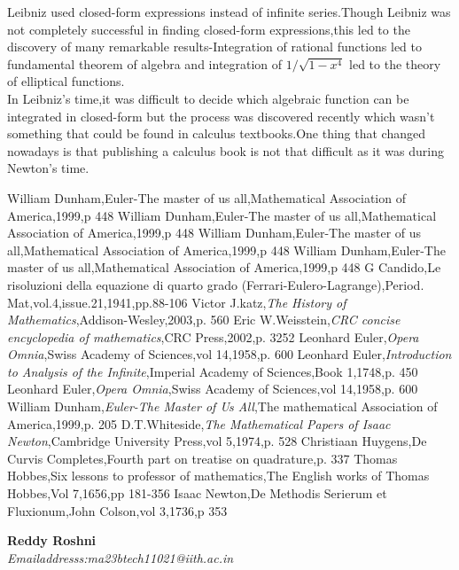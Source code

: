 \documentclass[a4paper,reqno,11pt]{book}
\theoremstyle{plain}%
\theoremstyle{definition}
\begin{document}
\indent Leibniz used closed-form expressions instead of infinite series.Though Leibniz was not completely successful in finding closed-form expressions,this led to the discovery of many remarkable results-Integration of rational functions led to fundamental theorem of algebra and integration of $1/\sqrt{1-x^4}$ led to the theory of elliptical functions.\\
\indent In Leibniz's time,it was difficult to decide which algebraic function can be integrated in closed-form but the process was discovered recently which wasn't something that could be found in calculus textbooks.One thing that changed nowadays is that publishing a calculus book is not that difficult as it was during Newton's time.


\begin{thebibliography}{99}
William Dunham,Euler-The master of us all,Mathematical Association of America,1999,p 448
William Dunham,Euler-The master of us all,Mathematical Association of America,1999,p 448
William Dunham,Euler-The master of us all,Mathematical Association of America,1999,p 448
William Dunham,Euler-The master of us all,Mathematical Association of America,1999,p 448
 G Candido,Le risoluzioni della equazione di quarto grado (Ferrari-Eulero-Lagrange),Period. Mat,vol.4,issue.21,1941,pp.88-106
	Victor J.katz,\textit{The History of Mathematics},Addison-Wesley,2003,p. 560
 Eric W.Weisstein,\textit{CRC concise encyclopedia of mathematics},CRC Press,2002,p. 3252 
 Leonhard Euler,\textit{Opera Omnia},Swiss Academy of Sciences,vol 14,1958,p. 600
 Leonhard Euler,\textit{Introduction to Analysis of the Infinite},Imperial Academy of Sciences,Book 1,1748,p. 450
 Leonhard Euler,\textit{Opera Omnia},Swiss Academy of Sciences,vol 14,1958,p. 600
 William Dunham,\textit{Euler-The Master of Us All},The mathematical Association of America,1999,p. 205
 D.T.Whiteside,\textit{The Mathematical Papers of Isaac Newton},Cambridge University Press,vol 5,1974,p. 528
 Christiaan Huygens,De Curvis Completes,Fourth part on treatise on quadrature,p. 337
 Thomas Hobbes,Six lessons to professor of mathematics,The English works of Thomas Hobbes,Vol 7,1656,pp 181-356
 Isaac Newton,De Methodis Serierum et Fluxionum,John Colson,vol 3,1736,p 353
\end{thebibliography}
\textbf{Reddy Roshni}\\
\textit{Emailaddresss:ma23btech11021@iith.ac.in}
\end{document}
